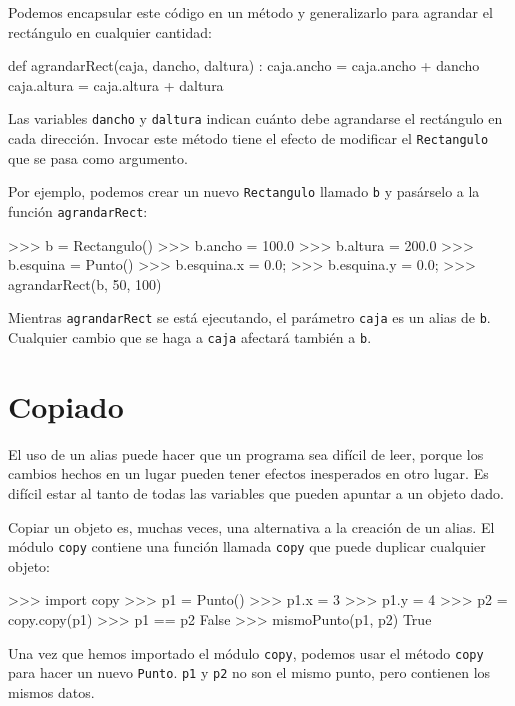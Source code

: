 Podemos encapsular este código en un método y generalizarlo para agrandar
el rectángulo en cualquier cantidad:

 
\begin{pythoncode}
def agrandarRect(caja, dancho, daltura) :
  caja.ancho = caja.ancho + dancho
  caja.altura = caja.altura + daltura
\end{pythoncode}

Las variables \texttt{dancho} y \texttt{daltura} indican cuánto debe
agrandarse el rectángulo en cada dirección. Invocar este método tiene
el efecto de modificar el \texttt{Rectangulo} que se pasa como argumento.

Por ejemplo, podemos crear un nuevo \texttt{Rectangulo} llamado \texttt{b}
y pasárselo a la función \texttt{agrandarRect}:
\begin{pyconcode}
>>> b = Rectangulo()
>>> b.ancho = 100.0
>>> b.altura = 200.0
>>> b.esquina = Punto()
>>> b.esquina.x = 0.0;
>>> b.esquina.y = 0.0;
>>> agrandarRect(b, 50, 100)
\end{pyconcode}

Mientras \texttt{agrandarRect} se está ejecutando, el parámetro \texttt{caja}
es un alias de \texttt{b}. Cualquier cambio que se haga a \texttt{caja}
afectará también a \texttt{b}.

\section{Copiado}

   

El uso de un alias puede hacer que un programa sea difícil de leer,
porque los cambios hechos en un lugar pueden tener efectos inesperados
en otro lugar. Es difícil estar al tanto de todas las variables que
pueden apuntar a un objeto dado.

Copiar un objeto es, muchas veces, una alternativa a la creación de
un alias. El módulo \texttt{copy} contiene una función llamada \texttt{copy}
que puede duplicar cualquier objeto:
\begin{pyconcode}
>>> import copy
>>> p1 = Punto()
>>> p1.x = 3
>>> p1.y = 4
>>> p2 = copy.copy(p1)
>>> p1 == p2
False
>>> mismoPunto(p1, p2)
True
\end{pyconcode}

Una vez que hemos importado el módulo \texttt{copy}, podemos usar
el método \texttt{copy} para hacer un nuevo \texttt{Punto}. \texttt{p1}
y \texttt{p2} no son el mismo punto, pero contienen los mismos datos.

